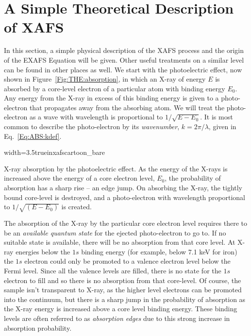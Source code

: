 \section{A Simple Theoretical Description of XAFS}{\label{Sect:theory}}

In this section, a simple physical description of the XAFS process and the
origin of the EXAFS Equation will be given.  Other useful treatments on a
similar level can be found in other
places\cite{Stern1988,RehrAlbersRMP2000} as well.  We start with the
photoelectric effect, now shown in Figure~\ref{Fig:THE:absorption}, in which
an X-ray of energy $E$ is absorbed by a core-level electron of a particular
atom with binding energy $E_0$.  Any energy from the X-ray in excess of
this binding energy is given to a photo-electron that propagates away from
the absorbing atom.  We will treat the photo-electron as a wave with
wavelength is proportional to $1/\sqrt{E-E_0}$.  It is most common to
describe the photo-electron by its {\emph{wavenumber}}, $k = 2\pi/\lambda$,
given in Eq.~\ref{Eq:ABS:kdef}.

\begin{Nfig}{width=3.5truein}{xafscartoon_bare}
  \caption{X-ray absorption by the photoelectric effect.  As the energy of
    the X-rays is increased above the energy of a core electron level,
    $E_0$, the probability of absorption has a sharp rise -- an edge jump.
    On absorbing the X-ray, the tightly bound core-level is destroyed, and
    a photo-electron with wavelength proportional to $1/\sqrt{(E-E_0)}$ is
    created.}
  \label{Fig:THE:absorption}
\end{Nfig}


The absorption of the X-ray by the particular core electron level requires
there to be an \emph{available quantum state} for the ejected
photo-electron to go to.  If no suitable state is available, there will be
no absorption from that core level.  At X-ray energies below the $1s$
binding energy (for example, below 7.1 keV for iron) the $1s$ electron
could only be promoted to a valence electron level below the Fermi level.
Since all the valence levels are filled, there is no state for the $1s$
electron to fill and so there is no absorption from that core-level.  Of
course, the sample isn't transparent to X-ray, as the higher level
electrons can be promoted into the continuum, but there is a sharp jump in
the probability of absorption as the X-ray energy is increased above a core
level binding energy.  These binding levels are often referred to as
{\emph{ absorption edges}} due to this strong increase in absorption
probability.

